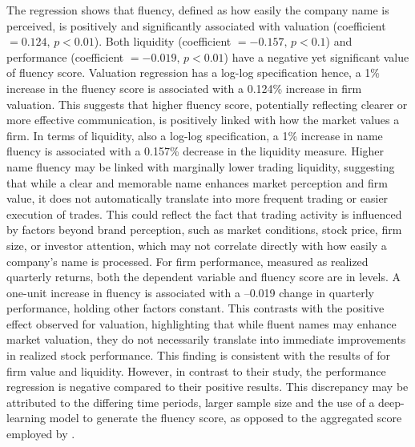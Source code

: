 \documentclass[a4paper,11pt]{report}
\begin{document}
The regression shows that fluency, defined as how easily the company name is perceived, is positively and significantly associated with valuation (coefficient $= 0.124,\, p < 0.01$). Both liquidity (coefficient $= -0.157,\, p < 0.1$) and performance (coefficient $= -0.019,\, p < 0.01$) have a negative yet significant value of fluency score. Valuation regression has a log-log specification hence, a 1\% increase in the fluency score is associated with a 0.124\% increase in firm valuation. This suggests that higher fluency score, potentially reflecting clearer or more effective communication, is positively linked with how the market values a firm. In terms of liquidity, also a log-log specification, a 1\% increase in name fluency is associated with a 0.157\% decrease in the liquidity measure. Higher name fluency may be linked with marginally lower trading liquidity, suggesting that while a clear and memorable name enhances market perception and firm value, it does not automatically translate into more frequent trading or easier execution of trades. This could reflect the fact that trading activity is influenced by factors beyond brand perception, such as market conditions, stock price, firm size, or investor attention, which may not correlate directly with how easily a company’s name is processed. For firm performance, measured as realized quarterly returns, both the dependent variable and fluency score are in levels. A one-unit increase in fluency is associated with a –0.019 change in quarterly performance, holding other factors constant. This contrasts with the positive effect observed for valuation, highlighting that while fluent names may enhance market valuation, they do not necessarily translate into immediate improvements in realized stock performance. This finding is consistent with the results of  for firm value and liquidity. However, in contrast to their study, the performance regression is negative compared to their positive results. This discrepancy may be attributed to the differing time periods, larger sample size and the use of a deep-learning model to generate the fluency score, as opposed to the aggregated score employed by . 
\end{document}
